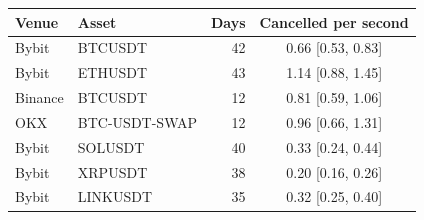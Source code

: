 \begin{tabular}{llrc}
\toprule
Venue & Asset & Days & Cancelled per second \\
\midrule
Bybit & BTCUSDT & 42 & 0.66 {\scriptsize[0.53, 0.83]} \\
Bybit & ETHUSDT & 43 & 1.14 {\scriptsize[0.88, 1.45]} \\
Binance & BTCUSDT & 12 & 0.81 {\scriptsize[0.59, 1.06]} \\
OKX & BTC-USDT-SWAP & 12 & 0.96 {\scriptsize[0.66, 1.31]} \\
Bybit & SOLUSDT & 40 & 0.33 {\scriptsize[0.24, 0.44]} \\
Bybit & XRPUSDT & 38 & 0.20 {\scriptsize[0.16, 0.26]} \\
Bybit & LINKUSDT & 35 & 0.32 {\scriptsize[0.25, 0.40]} \\
\bottomrule
\end{tabular}
